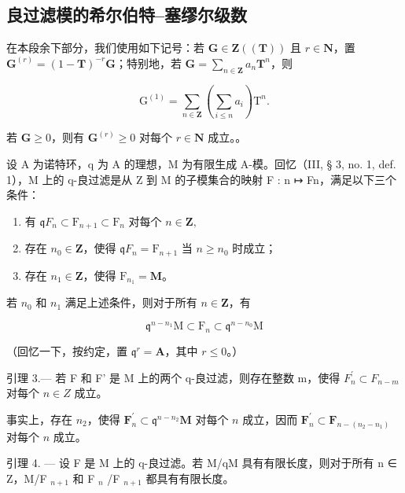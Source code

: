 \subsection{良过滤模的希尔伯特–塞缪尔级数}

在本段余下部分，我们使用如下记号：若 \(\mathbf{G} \in \mathbf{Z}((\mathbf{T}))\) 且 \(r \in \mathbf{N}\)，置 \(\mathbf{G}^{(r)} = (1 - \mathbf{T})^{-r}\mathbf{G}\)；特别地，若 \(\mathbf{G} = \sum_{n \in \mathbf{Z}} a_n \mathbf{T}^n\)，则

\[
\mathrm{G} ^ {(1)} = \sum_ {n \in \mathbf {Z}} \left(\sum_ {i \leqslant n} a _ {i}\right) \mathrm{T} ^ {n}.
\]

若 \(\mathbf{G} \geqslant 0\)，则有 \(\mathbf{G}^{(r)} \geqslant 0\) 对每个 \(r \in \mathbf{N}\) 成立。。

设 A 为诺特环，q 为 A 的理想，M 为有限生成 A-模。回忆（III, § 3, no. 1, def. 1），M 上的 q-良过滤是从 Z 到 M 的子模集合的映射 F : n ↦ Fn，满足以下三个条件：

\begin{enumerate}
\def\labelenumi{\alph{enumi})}
\item
  有 \(\mathfrak{q}F_n\subset \mathrm{F}_{n + 1}\subset \mathrm{F}_n\) 对每个 \(n\in \mathbf{Z},\)
\item
  存在 \(n_0 \in \mathbf{Z}\)，使得 \(\mathfrak{q}F_n = \mathrm{F}_{n+1}\) 当 \(n \geqslant n_0\) 时成立；
\item
  存在 \(n_{1} \in \mathbf{Z}\)，使得 \(\mathrm{F}_{n_1} = \mathbf{M}\)。
\end{enumerate}

若 \(n_{0}\) 和 \(n_{1}\) 满足上述条件，则对于所有 \(n\in\mathbf{Z}\)，有

\[
\mathfrak {q} ^ {n - n _ {1}} \mathrm{M} \subset \mathrm{F} _ {n} \subset \mathfrak {q} ^ {n - n _ {0}} \mathrm{M}\tag{7}
\]

（回忆一下，按约定，置 \(\mathfrak{q}^r = \mathbf{A}\)，其中 \(r\leqslant 0\)。）

引理 3.--- 若 F 和 F' 是 M 上的两个 q-良过滤，则存在整数 m，使得 \(F_{n}^{\prime} \subset F_{n-m}\) 对每个 \(n \in Z\) 成立。

事实上，存在 \(n_{2}\)，使得 \(\mathbf{F}_{n}^{\prime}\subset\mathfrak{q}^{n-n_{2}}\mathbf{M}\) 对每个 \(n\) 成立，因而 \(\mathbf{F}_{n}^{\prime}\subset\mathbf{F}_{n-(n_{2}-n_{1})}\) 对每个 \(n\) 成立。

引理 4. --- 设 F 是 M 上的 q-良过滤。若 M/qM 具有有限长度，则对于所有 n ∈ Z，M/F \(_{n+1}\) 和 F \(_{n}\) /F \(_{n+1}\) 都具有有限长度。

